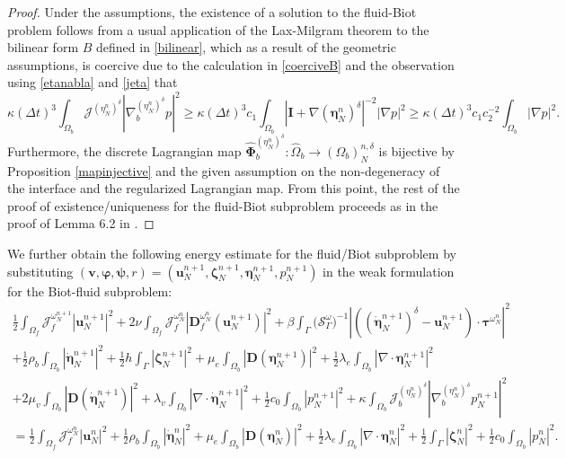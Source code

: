 \documentclass[11pt]{article}
\newcommand{\bd}{\boldsymbol}
\theoremstyle{definition}
\begin{document}
\begin{proof}
Under the assumptions, the existence of a solution to the fluid-Biot problem follows from a usual application of the Lax-Milgram theorem to the bilinear form $B$ defined in \eqref{bilinear}, which as a result of the geometric assumptions, is coercive due to the calculation in \eqref{coerciveB} and the observation using \eqref{etanabla} and \eqref{jeta} that
\begin{equation}\label{kappabound}
\kappa (\Delta t)^{3} \int_{\Omega_{b}} \mathcal{J}^{(\eta^{n}_{N})^{\delta}} |\nabla_{b}^{(\eta^{n}_{N})^{\delta}}p|^{2} \ge \kappa (\Delta t)^{3} c_{1} \int_{\Omega_{b}} |\bd{I} + \nabla(\bd{\eta}^{n}_{N})^{\delta}|^{-2} |\nabla p|^{2} \ge \kappa (\Delta t)^{3} c_{1} c_{2}^{-2} \int_{\Omega_{b}} |\nabla p|^{2}.
\end{equation}
Furthermore, the discrete Lagrangian map $\hat{\bd{\Phi}}^{(\eta^{n}_{N})^{\delta}}_{b}: \hat{\Omega}_{b} \to (\Omega_{b})^{n, \delta}_{N}$ is bijective by Proposition \ref{mapinjective} and the given assumption on the non-degeneracy of the interface and the regularized Lagrangian map. From this point, the rest of the proof of existence/uniqueness for the fluid-Biot subproblem proceeds as in the proof of Lemma 6.2 in \cite{FPSIJMPA}.
\end{proof}

We further obtain the following energy estimate for the fluid/Biot subproblem by substituting $(\bd{v}, \bd{\varphi}, \bd{\psi}, r) = (\bd{u}^{n + 1}_{N}, \bd{\zeta}^{n + 1}_{N}, \bd{\eta}^{n + 1}_{N}, p^{n + 1}_{N})$ in the weak formulation for the Biot-fluid subproblem:
\begin{multline}\label{energyBiot}
\frac{1}{2} \int_{\Omega_{f}} \mathcal{J}^{\omega^{n + 1}_{N}}_{f} |\bd{u}^{n + 1}_{N}|^{2} + 2\nu \int_{\Omega_{f}} \mathcal{J}^{\omega^{n}_{N}}_{f} |\bd{D}^{\omega^{n}_{N}}_{f}(\bd{u}^{n + 1}_{N})|^{2} + \beta \int_{\Gamma} \Big(\mathcal{S}^{\omega}_{\Gamma}\Big)^{-1} \left|\left(\left(\dot{\bd{\eta}}^{n + 1}_{N}\right)^{\delta} - \bd{u}^{n + 1}_{N}\right) \cdot \bd{\tau}^{\omega^{n}_{N}}\right|^{2} \\
+ \frac{1}{2}\rho_{b} \int_{\Omega_{b}} |\dot{\bd{\eta}}^{n + 1}_{N}|^{2} + \frac{1}{2} h \int_{\Gamma} |\bd{\zeta}^{n + 1}_{N}|^{2} + \mu_{e} \int_{\Omega_{b}} |\bd{D}(\bd{\eta}^{n + 1}_{N})|^{2} + \frac{1}{2} \lambda_{e} \int_{\Omega_{b}} |\nabla \cdot \bd{\eta}^{n + 1}_{N}|^{2} \\
+ 2\mu_{v} \int_{\Omega_{b}} |\bd{D}(\dot{\bd{\eta}}^{n + 1}_{N})|^{2} + \lambda_{v} \int_{\Omega_{b}} |\nabla \cdot \dot{\bd{\eta}}^{n + 1}_{N}|^{2} + \frac{1}{2}c_{0}\int_{\Omega_{b}} |p^{n + 1}_{N}|^{2} + \kappa \int_{\Omega_{b}} \mathcal{J}^{(\eta^{n}_{N})^{\delta}}_{b} \left|\nabla^{(\eta^{n}_{N})^{\delta}}_{b} p^{n + 1}_{N}\right|^{2} \\
= \frac{1}{2} \int_{\Omega_{f}} \mathcal{J}^{\omega^{n}_{N}}_{f} |\bd{u}^{n}_{N}|^{2} + \frac{1}{2}\rho_{b} \int_{\Omega_{b}} |\dot{\bd{\eta}}^{n}_{N}|^{2} + \mu_{e} \int_{\Omega_{b}} |\bd{D}(\bd{\eta}^{n}_{N})|^{2} + \frac{1}{2}\lambda_{e} \int_{\Omega_{b}} |\nabla \cdot \bd{\eta}^{n}_{N}|^{2} + \frac{1}{2} \int_{\Gamma} |\bd{\zeta}^{n}_{N}|^{2} + \frac{1}{2} c_{0} \int_{\Omega_{b}} |p^{n}_{N}|^{2}.
\end{multline}
\end{document}
